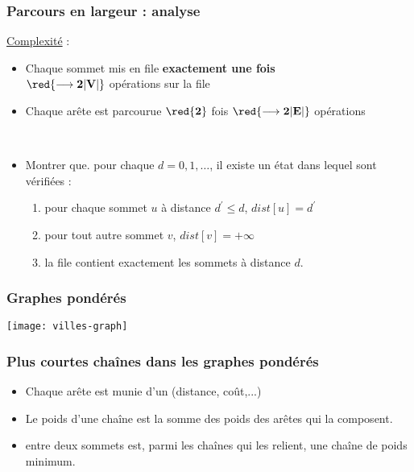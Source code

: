 \begin{frame}
  \frametitle{Parcours en largeur : analyse}
  \underline{Complexité} : 
  \begin{itemize}
  \item<2-> Chaque sommet mis en file \textbf{exactement une fois} \\
    \hfill $\red{\longrightarrow \mathbf{2|V|}}$ opérations sur la file
  \item<3-> Chaque arête est parcourue $\red{\mathbf{2}}$ fois 
    \hfill $\red{\longrightarrow \mathbf{2|E|}}$ opérations 
  \end{itemize}
~\\
  \begin{itemize}
  \item<6->[] Montrer que. pour chaque $d=0,1,\ldots$, il existe un état dans lequel sont vérifiées :
    \begin{enumerate}
    \item pour chaque sommet $u$ à distance $d^{'}\leq d$, $dist[u]=d^{'}$
    \item pour tout autre sommet $v$, $dist[v] = +\infty$
    \item la file contient exactement les sommets à distance $d$.
    \end{enumerate}
  \end{itemize}
\end{frame}


\begin{frame}
  \frametitle{Graphes pondérés}
  \begin{center}
    \texttt{[image: villes-graph]}
  \end{center}
\end{frame}


\begin{frame}
  \frametitle{Plus courtes chaînes dans les graphes pondérés}
  \begin{itemize}
 \item[] Chaque arête est munie d'un  (distance, coût,...)
  \item [] Le poids d’une chaîne est la somme des poids des arêtes qui la composent.
 \item[]   entre deux sommets est, parmi les chaînes qui les relient, une chaîne de poids minimum.
 \end{itemize}   
\end{frame}

